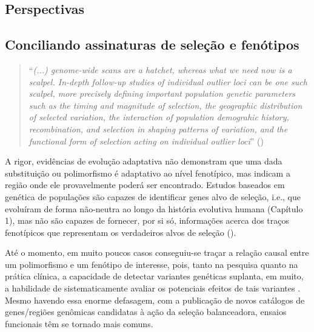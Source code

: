 \begin{refsection}
\section{Perspectivas}
\subsection{Conciliando assinaturas de seleção e fenótipos}

\begin{quote}
\enquote{\emph{(...) genome-wide scans are a hatchet, whereas what we need now is a scalpel. In-depth follow-up studies of individual outlier loci can be one such scalpel, more precisely defining important population genetic parameters such as the timing and magnitude of selection, the geographic distribution of selected variation, the interaction of population demograhic history, recombination, and selection in shaping patterns of variation, and the functional form of selection acting on individual outlier loci}} (\cite{Akey2009})
\end{quote} 

	A rigor, evidências de evolução adaptativa não demonstram que uma dada substituição ou polimorfismo é adaptativo ao nível fenotípico, mas indicam a região onde ele provavelmente poderá ser encontrado. Estudos baseados em genética de populações são capazes de identificar genes alvo de seleção, i.e., que evoluíram de forma não-neutra ao longo da história evolutiva humana (Capítulo 1), mas não são capazes de fornecer, por si só, informações acerca dos traços fenotípicos que representam os verdadeiros alvos de seleção (\cite{Mitchell-Olds2007}). 
  
	 Até o momento, em muito poucos casos conseguiu-se traçar a relação causal entre um polimorfismo e um fenótipo de interesse, pois, tanto na pesquisa quanto na prática clínica, a capacidade de detectar variantes genéticas suplanta, em muito, a habilidade de sistematicamente avaliar os potenciais efeitos de tais variantes \parencite{Kircher2014}. Mesmo havendo essa enorme defasagem, com a publicação de novos catálogos de genes/regiões genômicas candidatas à ação da seleção balanceadora, ensaios funcionais têm se tornado mais comuns. 
     

\end{refsection}
